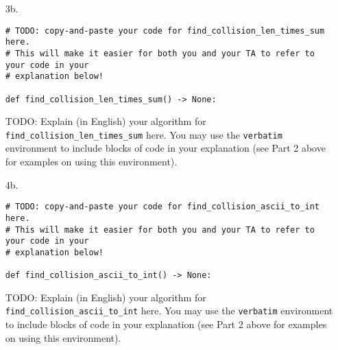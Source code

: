 \documentclass[11pt]{article}
\begin{document}
\begin{enumerate}

\item[3b.]

\begin{verbatim}
# TODO: copy-and-paste your code for find_collision_len_times_sum here.
# This will make it easier for both you and your TA to refer to your code in your
# explanation below!

def find_collision_len_times_sum() -> None:

\end{verbatim}


TODO: Explain (in English) your algorithm for \texttt{find\_collision\_len\_times\_sum} here.
You may use the \texttt{verbatim} environment to include blocks of code in your explanation (see Part 2 above for examples on using this environment).

\newpage

\item[4b.]

\begin{verbatim}
# TODO: copy-and-paste your code for find_collision_ascii_to_int here.
# This will make it easier for both you and your TA to refer to your code in your
# explanation below!

def find_collision_ascii_to_int() -> None:

\end{verbatim}

TODO: Explain (in English) your algorithm for \texttt{find\_collision\_ascii\_to\_int} here.
You may use the \texttt{verbatim} environment to include blocks of code in your explanation (see Part 2 above for examples on using this environment).

\end{enumerate}
\end{document}
